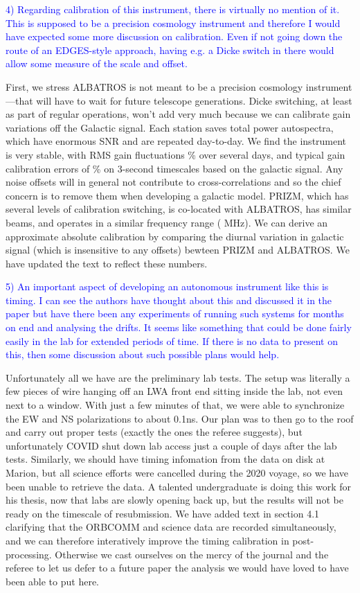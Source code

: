 \documentclass[11pt]{article}
\begin{document}
\noindent \textcolor{blue}{4) Regarding calibration of this
  instrument, there is virtually no mention of it. This is supposed to
  be a precision cosmology instrument and therefore I would have
  expected some more discussion on calibration. Even if not going down
  the route of an EDGES-style approach, having e.g. a Dicke switch in
  there would allow some measure of the scale and offset.}

First, we stress ALBATROS is not meant to be a precision cosmology
instrument---that will have to wait for future telescope generations.
Dicke switching, at least as part of regular operations, won't add
very much because we can calibrate gain variations off the Galactic
signal.  Each station saves total power autospectra, which have
enormous SNR and are repeated day-to-day.  We find the instrument is
very stable, with RMS gain fluctuations \% over several days,
and typical gain calibration errors of \% on 3-second timescales
based on the galactic signal.  Any noise offsets will in general not
contribute to cross-correlations and so the chief concern is to remove
them when developing a galactic model.  PRIZM, which has several
levels of calibration switching, is co-located with ALBATROS, has
similar beams, and operates in a similar frequency range ( MHz).
We can derive an approximate absolute calibration by comparing the
diurnal variation in galactic signal (which is insensitive to any
offsets) bewteen PRIZM and ALBATROS.  We have updated the text to
reflect these numbers.

\noindent \textcolor{blue}{5) An important aspect of developing an
  autonomous instrument like this is timing. I can see the authors
  have thought about this and discussed it in the paper but have there
  been any experiments of running such systems for months on end and
  analysing the drifts. It seems like something that could be done
  fairly easily in the lab for extended periods of time. If there is
  no data to present on this, then some discussion about such possible
  plans would help.}

Unfortunately all we have are the preliminary lab tests.  The setup
was literally a few pieces of wire hanging off an LWA front end
sitting inside the lab, not even next to a window.  With just a few
minutes of that, we were able to synchronize the EW and NS
polarizations to about 0.1ns.  Our plan was to then go to the roof and
carry out proper tests (exactly the ones the referee suggests), but
unfortunately COVID shut down lab access just a couple of days after
the lab tests.  Similarly, we should have timing infomation from the
data on disk at Marion, but all science efforts were cancelled during
the 2020 voyage, so we have been unable to retrieve the data.  A
talented undergraduate is doing this work for his thesis, now that
labs are slowly opening back up, but the results will not be ready on
the timescale of resubmission.  We have added text in section 4.1
clarifying that the ORBCOMM and science data are recorded
simultaneously, and we can therefore interatively improve the timing
calibration in post-processing.  Otherwise we cast ourselves on the
mercy of the journal and the referee to let us defer to a future paper
the analysis we would have loved to have been able to put here.
\end{document}

